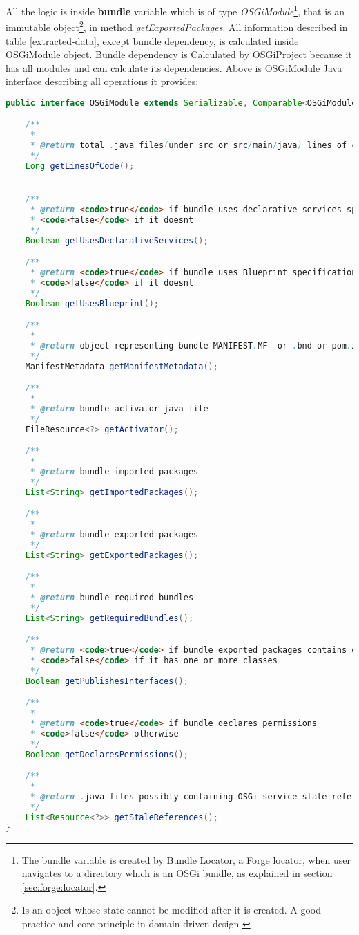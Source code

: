 All the logic is inside \textbf{bundle} variable which is of type \emph{OSGiModule}\footnote{The bundle variable is created by Bundle Locator, a Forge locator, when user navigates to a directory which is an OSGi bundle, as explained in section \ref{sec:forge:locator}.}, that is an immutable object\footnote{Is an object whose state cannot be modified after it is created. A good practice and core principle in domain driven design \citep{Evans 2003}}, in method \emph{getExportedPackages}. All information described in table \ref{extracted-data}, except bundle dependency, is calculated inside OSGiModule object. Bundle dependency is Calculated by OSGiProject because it has all modules and can calculate its dependencies. Above is OSGiModule Java interface describing all operations it provides:\newpage

\begin{lstlisting}[language=java,label=Intrabundle OSGiModule,caption=Intrabundle OSGiModule interface]
public interface OSGiModule extends Serializable, Comparable<OSGiModule>{

    /**
     *
     * @return total .java files(under src or src/main/java) lines of code
     */
    Long getLinesOfCode();


    /**
     * @return <code>true</code> if bundle uses declarative services specification
     * <code>false</code> if it doesnt
     */
    Boolean getUsesDeclarativeServices();

    /**
     * @return <code>true</code> if bundle uses Blueprint specification
     * <code>false</code> if it doesnt
     */
    Boolean getUsesBlueprint();

    /**
     *
     * @return object representing bundle MANIFEST.MF  or .bnd or pom.xml with maven-bundle-plugin
     */
    ManifestMetadata getManifestMetadata();

    /**
     *
     * @return bundle activator java file
     */
    FileResource<?> getActivator();

    /**
     *
     * @return bundle imported packages
     */
    List<String> getImportedPackages();

    /**
     *
     * @return bundle exported packages
     */
    List<String> getExportedPackages();

    /**
     *
     * @return bundle required bundles
     */
    List<String> getRequiredBundles();

    /**
     * @return <code>true</code> if bundle exported packages contains only interfaces
     * <code>false</code> if it has one or more classes
     */
    Boolean getPublishesInterfaces();

    /**
     *
     * @return <code>true</code> if bundle declares permissions
     * <code>false</code> otherwise
     */
    Boolean getDeclaresPermissions();

    /**
     *
     * @return .java files possibly containing OSGi service stale references
     */
    List<Resource<?>> getStaleReferences();
}
\end{lstlisting}
\FloatBarrier


